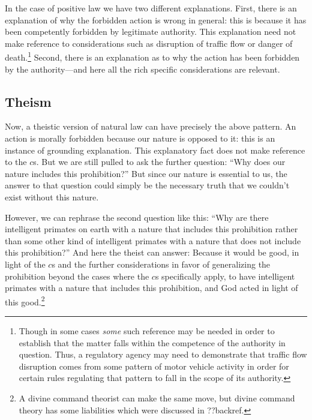 In the case of positive law we have two different explanations. First, there is an explanation of why
the forbidden action is wrong in general: this is because it has been competently forbidden by legitimate authority.
This explanation need not make reference to considerations such as disruption of traffic flow or danger
of death.\footnote{Though in some cases \textit{some} such reference may be needed in order to establish
that the matter falls within the competence of the authority in question. Thus, a regulatory agency may
need to demonstrate that traffic flow disruption comes from some pattern of motor vehicle activity in order 
for certain rules regulating that pattern to fall in the scope of its authority.} Second, there is an 
explanation as to why the action has been forbidden by the authority---and here all the rich specific 
considerations are relevant.

\subsection{Theism}\label{sec:theistic-explanation}
Now, a theistic version of natural law can have precisely the above pattern. An action is morally forbidden because
our nature is opposed to it: this is an instance of grounding explanation. This explanatory fact does not make reference 
to the $c$s. But we are still pulled to ask the further question: ``Why does our nature 
includes this prohibition?'' But since our nature is essential to us, the answer to that question could 
simply be the necessary truth that we couldn't exist without this nature. 

However, we can rephrase the second question like this: ``Why are there intelligent primates on earth with a nature that includes this prohibition
rather than some other kind of intelligent primates with a nature that does not include this prohibition?''
And here the theist can answer: Because it would be good, in light of the $c$s and the
further considerations in favor of generalizing the prohibition beyond the cases where the $c$s specifically
apply, to have intelligent primates with a nature that includes this prohibition, and God acted in light
of this good.\footnote{A divine command theorist can make the same move, but divine command theory has some
liabilities which were discussed in ??backref.}

